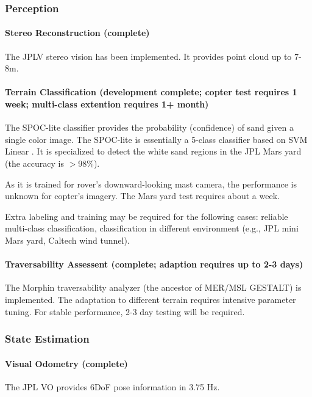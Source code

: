 \documentclass[conference]{IEEEtran}
\newcommand{\done}[1]{{\color{gray} #1}}
\begin{document}
\subsubsection{Perception}

\paragraph{Stereo Reconstruction (complete)}
\done{
The JPLV stereo vision has been implemented. It provides point cloud up to 7-8m. 
}

\paragraph{Terrain Classification (development complete; copter test requires 1 week; multi-class extention requires 1+ month)}
The SPOC-lite classifier provides the probability (confidence) of sand given a single color image. The SPOC-lite is essentially a 5-class classifier based on SVM Linear \cite{liblinear}. It is specialized to detect the white sand regions in the JPL Mars yard (the accuracy is $>$98\%).

As it is trained for rover's downward-looking mast camera, the performance is unknown for copter's imagery. The Mars yard test requires about a week. 

Extra labeling and training may be required for the following cases: reliable multi-class classification, classification in different environment (e.g., JPL mini Mars yard, Caltech wind tunnel). 


\paragraph{Traversability Assessent (complete; adaption requires up to 2-3 days)}
\done{
The Morphin traversability analyzer (the ancestor of MER/MSL GESTALT) is implemented. The adaptation to different terrain requires intensive parameter tuning. For stable performance, 2-3 day testing will be required.
}


\subsubsection{State Estimation}

\paragraph{Visual Odometry (complete)}
\done{
The JPL VO provides 6DoF pose information in 3.75 Hz. 
}
\end{document}
